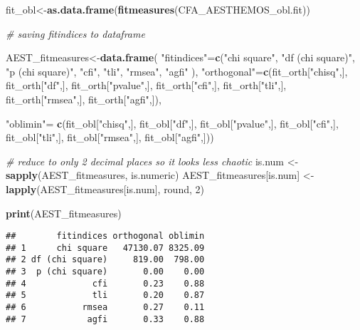 \documentclass[
]{article}
\newenvironment{Shaded}{\begin{snugshade}}{\end{snugshade}}
\newcommand{\CommentTok}[1]{\textcolor[rgb]{0.56,0.35,0.01}{\textit{#1}}}
\newcommand{\DecValTok}[1]{\textcolor[rgb]{0.00,0.00,0.81}{#1}}
\newcommand{\KeywordTok}[1]{\textcolor[rgb]{0.13,0.29,0.53}{\textbf{#1}}}
\newcommand{\NormalTok}[1]{#1}
\newcommand{\StringTok}[1]{\textcolor[rgb]{0.31,0.60,0.02}{#1}}
\begin{document}
\begin{Shaded}
\begin{Highlighting}[]
\NormalTok{fit\_obl\textless{}{-}}\KeywordTok{as.data.frame}\NormalTok{(}\KeywordTok{fitmeasures}\NormalTok{(CFA\_AESTHEMOS\_obl.fit))}


\CommentTok{\# saving fitindices to dataframe}

\NormalTok{AEST\_fitmeasures\textless{}{-}}\KeywordTok{data.frame}\NormalTok{(}
  \StringTok{"fitindices"}\NormalTok{=}\KeywordTok{c}\NormalTok{(}\StringTok{"chi square"}\NormalTok{, }
                 \StringTok{"df (chi square)"}\NormalTok{, }
                 \StringTok{"p (chi square)"}\NormalTok{,}
                 \StringTok{"cfi"}\NormalTok{, }
                 \StringTok{"tli"}\NormalTok{, }
                 \StringTok{"rmsea"}\NormalTok{, }
                 \StringTok{"agfi"}\NormalTok{ ),}
  \StringTok{"orthogonal"}\NormalTok{=}\KeywordTok{c}\NormalTok{(fit\_orth[}\StringTok{"chisq"}\NormalTok{,], fit\_orth[}\StringTok{"df"}\NormalTok{,], fit\_orth[}\StringTok{"pvalue"}\NormalTok{,], fit\_orth[}\StringTok{"cfi"}\NormalTok{,], fit\_orth[}\StringTok{"tli"}\NormalTok{,], fit\_orth[}\StringTok{"rmsea"}\NormalTok{,], fit\_orth[}\StringTok{"agfi"}\NormalTok{,]),}
  
  \StringTok{"oblimin"}\NormalTok{=}\StringTok{ }\KeywordTok{c}\NormalTok{(fit\_obl[}\StringTok{"chisq"}\NormalTok{,], fit\_obl[}\StringTok{"df"}\NormalTok{,], fit\_obl[}\StringTok{"pvalue"}\NormalTok{,], fit\_obl[}\StringTok{"cfi"}\NormalTok{,], fit\_obl[}\StringTok{"tli"}\NormalTok{,], fit\_obl[}\StringTok{"rmsea"}\NormalTok{,], fit\_obl[}\StringTok{"agfi"}\NormalTok{,]))}

\CommentTok{\# reduce to only 2 decimal places so it looks less chaotic}
\NormalTok{is.num \textless{}{-}}\StringTok{ }\KeywordTok{sapply}\NormalTok{(AEST\_fitmeasures, is.numeric)}
\NormalTok{AEST\_fitmeasures[is.num] \textless{}{-}}\StringTok{ }\KeywordTok{lapply}\NormalTok{(AEST\_fitmeasures[is.num], round, }\DecValTok{2}\NormalTok{)}
\end{Highlighting}
\end{Shaded}

\begin{Shaded}
\begin{Highlighting}[]
\KeywordTok{print}\NormalTok{(AEST\_fitmeasures)}
\end{Highlighting}
\end{Shaded}

\begin{verbatim}
##        fitindices orthogonal oblimin
## 1      chi square   47130.07 8325.09
## 2 df (chi square)     819.00  798.00
## 3  p (chi square)       0.00    0.00
## 4             cfi       0.23    0.88
## 5             tli       0.20    0.87
## 6           rmsea       0.27    0.11
## 7            agfi       0.33    0.88
\end{verbatim}
\end{document}
